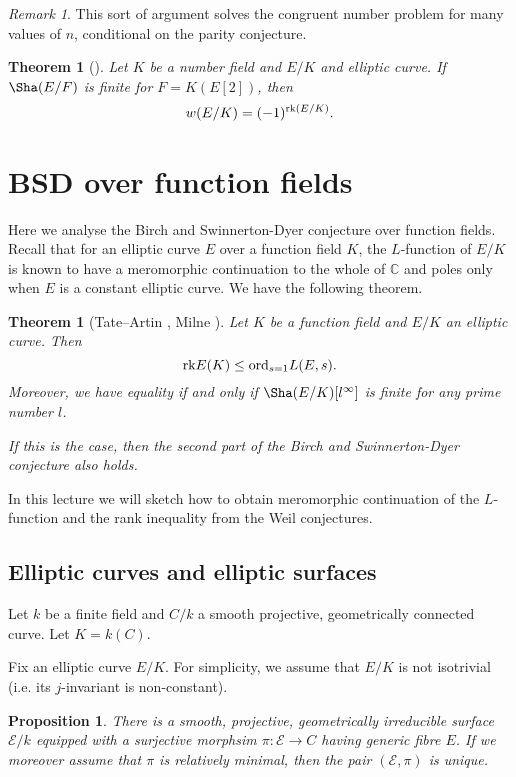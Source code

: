 \documentclass[12pt]{amsart}
\numberwithin{equation}{section}
\newtheorem{theorem}[equation]{Theorem}
\newtheorem{proposition}[equation]{Proposition}
\theoremstyle{remark}
\newtheorem{remark}[equation]{Remark}
\theoremstyle{definition}
\theoremstyle{definition}
\theoremstyle{definition}
\theoremstyle{definition}
\theoremstyle{definition}
\theoremstyle{definition}
\theoremstyle{definition}
\begin{document}
\begin{remark}
 This sort of argument solves the congruent number problem for many values of $n$, conditional on the parity conjecture.
\end{remark}

\begin{theorem}[{\cite[Theorem 1.2]{MR2831512}}]
Let $K$ be a number field and $E/K$ and elliptic curve. If $\Sha(E/F)$ is finite for $F=K(E[2])$, then 
\[w(E/K)=(-1)^{\textup{rk}(E/K)}.\]
\end{theorem}

\newpage

\section{BSD over function fields}

Here we analyse the Birch and Swinnerton-Dyer conjecture over function fields. Recall that for an elliptic curve $E$ over a function field $K$, the $L$-function of $E/K$ is known to have a meromorphic continuation to the whole of $\mathbb{C}$ and poles only when $E$ is a constant elliptic curve. We have the following theorem. 


\begin{theorem}[Tate--Artin \cite{MR1610977}, Milne \cite{MR0414558}] \label{main function field theorem}
Let $K$ be a function field and $E/K$ an elliptic curve. Then
\[\textup{rk}E(K)\leq \textup{ord}_{s=1}L(E,s).\]
Moreover, we have equality if and only if $\Sha(E/K)[l^\infty]$ is finite for any prime number $l$.

If this is the case, then the second part of the Birch and Swinnerton-Dyer conjecture also holds.
\end{theorem}

In this lecture we will sketch how to obtain meromorphic continuation of the $L$-function and the rank inequality from the Weil conjectures.  

\subsection{Elliptic curves and elliptic surfaces}

Let $k$ be a finite field and $C/k$ a smooth projective, geometrically connected curve. Let $K=k(C)$. 

Fix an elliptic curve $E/K$. For simplicity, we assume that $E/K$ is not isotrivial (i.e. its $j$-invariant is non-constant). 

\begin{proposition}
There is a smooth, projective, geometrically irreducible surface $\mathcal{E}/k$ equipped with a surjective morphsim $\pi:\mathcal{E}\rightarrow C$ having generic fibre $E$. If we moreover assume that $\pi$ is relatively minimal, then the pair $(\mathcal{E},\pi)$ is unique.   
\end{proposition}
\end{document}
